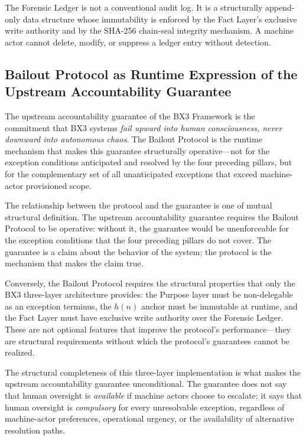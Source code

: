 The Forensic Ledger is not a conventional audit log. It is a structurally append-only data structure whose immutability is enforced by the Fact Layer's exclusive write authority and by the SHA-256 chain-seal integrity mechanism. A machine actor cannot delete, modify, or suppress a ledger entry without detection.

\subsection{Bailout Protocol as Runtime Expression of the Upstream Accountability Guarantee}
\label{sec:runtime-expression}

The upstream accountability guarantee of the BX3 Framework is the commitment that BX3 systems \emph{fail upward into human consciousness, never downward into autonomous chaos}. The Bailout Protocol is the runtime mechanism that makes this guarantee structurally operative---not for the exception conditions anticipated and resolved by the four preceding pillars, but for the complementary set of all unanticipated exceptions that exceed machine-actor provisioned scope.

The relationship between the protocol and the guarantee is one of mutual structural definition. The upstream accountability guarantee requires the Bailout Protocol to be operative: without it, the guarantee would be unenforceable for the exception conditions that the four preceding pillars do not cover. The guarantee is a claim about the behavior of the system; the protocol is the mechanism that makes the claim true.

Conversely, the Bailout Protocol requires the structural properties that only the BX3 three-layer architecture provides: the Purpose layer must be non-delegable as an exception terminus, the $h(n)$ anchor must be immutable at runtime, and the Fact Layer must have exclusive write authority over the Forensic Ledger. These are not optional features that improve the protocol's performance---they are structural requirements without which the protocol's guarantees cannot be realized.

The structural completeness of this three-layer implementation is what makes the upstream accountability guarantee unconditional. The guarantee does not say that human oversight is \emph{available} if machine actors choose to escalate; it says that human oversight is \emph{compulsory} for every unresolvable exception, regardless of machine-actor preferences, operational urgency, or the availability of alternative resolution paths.

